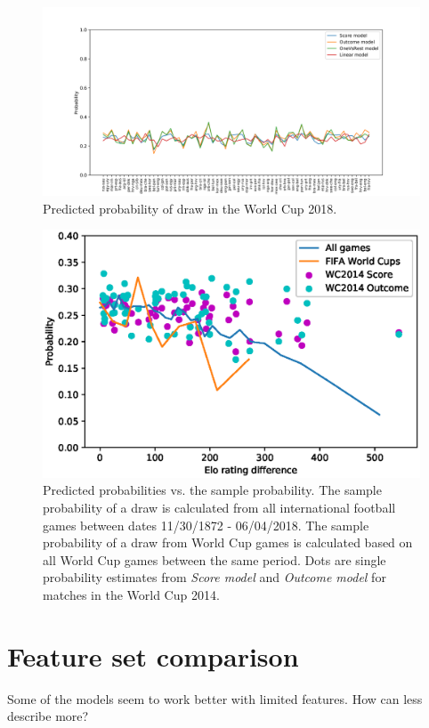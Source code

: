 \begin{figure}[H]
    \centering
    \includegraphics[width=1\textwidth]{img/match_level_2018_model_probability_draw_prob.png}
    \caption{Predicted probability of draw in the World Cup 2018.}
    \label{fig:draw_probability}
\end{figure}

\begin{figure}[H]
    \centering
    \includegraphics[width=1\textwidth]{img/draw_true_probability_wc.eps}
    \caption{Predicted probabilities vs. the sample probability. The sample probability of a draw is calculated from all international football games between dates 11/30/1872 - 06/04/2018. The sample probability of a draw from World Cup games is calculated based on all World Cup games between the same period. Dots are single probability estimates from \textit{Score model} and \textit{Outcome model} for matches in the World Cup 2014.}
    \label{fig:draw_prob_dist}
\end{figure}

\section{Feature set comparison}
Some of the models seem to work better with limited features. How can less describe more?

